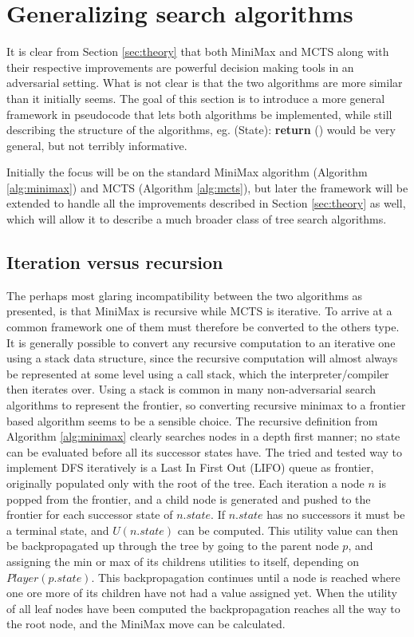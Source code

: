 \section{Generalizing search algorithms}
\label{sec:generalizing}

It is clear from Section \ref{sec:theory} that both MiniMax and MCTS along with their respective improvements are powerful decision making tools in an adversarial setting. What is not clear is that the two algorithms are more similar than it initially seems. The goal of this section is to introduce a more general framework in pseudocode that lets both algorithms be  implemented, while still describing the structure of the algorithms, eg. (State): \textbf{return} () would be very general, but not terribly informative.

Initially the focus will be on the standard MiniMax algorithm (Algorithm \ref{alg:minimax}) and MCTS (Algorithm \ref{alg:mcts}), but later the framework will be extended to handle all the improvements described in Section \ref{sec:theory} as well, which will allow it to describe a much broader class of tree search algorithms.

\subsection{Iteration versus recursion}

The perhaps most glaring incompatibility between the two algorithms as presented, is that MiniMax is recursive while MCTS is iterative. To arrive at a common framework one of them must therefore be converted to the others type. It is generally possible to convert any recursive computation to an iterative one using a stack data structure, since the recursive computation will almost always be represented at some level using a call stack, which the interpreter/compiler then iterates over. Using a stack is common in many non-adversarial search algorithms to represent the frontier, so converting recursive minimax to a frontier based algorithm seems to be a sensible choice. The recursive definition from Algorithm \ref{alg:minimax} clearly searches nodes in a depth first manner; no state can be evaluated before all its successor states have. The tried and tested way to implement DFS iteratively is a Last In First Out (LIFO) queue as frontier, originally populated only with the root of the tree. Each iteration a node $n$ is popped from the frontier, and a child node is generated and pushed to the frontier for each successor state of $n.state$. If $n.state$ has no successors it must be a terminal state, and $U(n.state)$ can be computed. This utility value can then be backpropagated up through the tree by going to the parent node $p$, and assigning the min or max of its childrens utilities to itself, depending on $Player(p.state)$. This backpropagation continues until a node is reached where one ore more of its children have not had a value assigned yet. When the utility of all leaf nodes have been computed the backpropagation reaches all the way to the root node, and the MiniMax move can be calculated.

